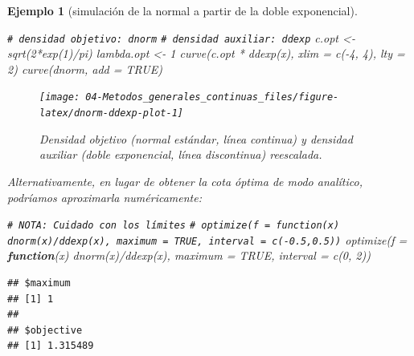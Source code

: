 \documentclass[
]{book}
\newenvironment{Shaded}{\begin{snugshade}}{\end{snugshade}}
\newcommand{\AttributeTok}[1]{\textcolor[rgb]{0.77,0.63,0.00}{#1}}
\newcommand{\CommentTok}[1]{\textcolor[rgb]{0.56,0.35,0.01}{\textit{#1}}}
\newcommand{\ConstantTok}[1]{\textcolor[rgb]{0.00,0.00,0.00}{#1}}
\newcommand{\ControlFlowTok}[1]{\textcolor[rgb]{0.13,0.29,0.53}{\textbf{#1}}}
\newcommand{\DecValTok}[1]{\textcolor[rgb]{0.00,0.00,0.81}{#1}}
\newcommand{\FunctionTok}[1]{\textcolor[rgb]{0.00,0.00,0.00}{#1}}
\newcommand{\NormalTok}[1]{#1}
\newcommand{\OtherTok}[1]{\textcolor[rgb]{0.56,0.35,0.01}{#1}}
\newcommand{\SpecialCharTok}[1]{\textcolor[rgb]{0.00,0.00,0.00}{#1}}
\theoremstyle{break}
\newtheorem{example}{Ejemplo}[chapter]
\theoremstyle{nonumberplain}
\renewcommand{\CommentTok}[1]{\textcolor[rgb]{0.41,0.41,0.41}{\texttt{#1}}}
\begin{document}
\begin{example}[simulación de la normal a partir de la doble exponencial]
\begin{Shaded}
\begin{Highlighting}[]
\CommentTok{\# densidad objetivo: dnorm}
\CommentTok{\# densidad auxiliar: ddexp}
\NormalTok{c.opt }\OtherTok{\textless{}{-}} \FunctionTok{sqrt}\NormalTok{(}\DecValTok{2}\SpecialCharTok{*}\FunctionTok{exp}\NormalTok{(}\DecValTok{1}\NormalTok{)}\SpecialCharTok{/}\NormalTok{pi)}
\NormalTok{lambda.opt }\OtherTok{\textless{}{-}} \DecValTok{1}
\FunctionTok{curve}\NormalTok{(c.opt }\SpecialCharTok{*} \FunctionTok{ddexp}\NormalTok{(x), }\AttributeTok{xlim =} \FunctionTok{c}\NormalTok{(}\SpecialCharTok{{-}}\DecValTok{4}\NormalTok{, }\DecValTok{4}\NormalTok{), }\AttributeTok{lty =} \DecValTok{2}\NormalTok{)}
\FunctionTok{curve}\NormalTok{(dnorm, }\AttributeTok{add =} \ConstantTok{TRUE}\NormalTok{)}
\end{Highlighting}
\end{Shaded}

\begin{figure}[!htb]

{\centering \texttt{[image: 04-Metodos\_generales\_continuas\_files/figure-latex/dnorm-ddexp-plot-1]} 

}

\caption{Densidad objetivo (normal estándar, línea continua) y densidad auxiliar (doble exponencial, línea discontinua) reescalada.}\label{fig:dnorm-ddexp-plot}
\end{figure}

Alternativamente, en lugar de obtener la cota óptima de modo analítico, podríamos aproximarla numéricamente:

\begin{Shaded}
\begin{Highlighting}[]
\CommentTok{\# NOTA: Cuidado con los límites}
\CommentTok{\# optimize(f = function(x) dnorm(x)/ddexp(x), maximum = TRUE, interval = c({-}0.5,0.5))}
\FunctionTok{optimize}\NormalTok{(}\AttributeTok{f =} \ControlFlowTok{function}\NormalTok{(x) }\FunctionTok{dnorm}\NormalTok{(x)}\SpecialCharTok{/}\FunctionTok{ddexp}\NormalTok{(x), }\AttributeTok{maximum =} \ConstantTok{TRUE}\NormalTok{, }\AttributeTok{interval =} \FunctionTok{c}\NormalTok{(}\DecValTok{0}\NormalTok{, }\DecValTok{2}\NormalTok{))}
\end{Highlighting}
\end{Shaded}

\begin{verbatim}
## $maximum
## [1] 1
## 
## $objective
## [1] 1.315489
\end{verbatim}


\end{example}
\end{document}
